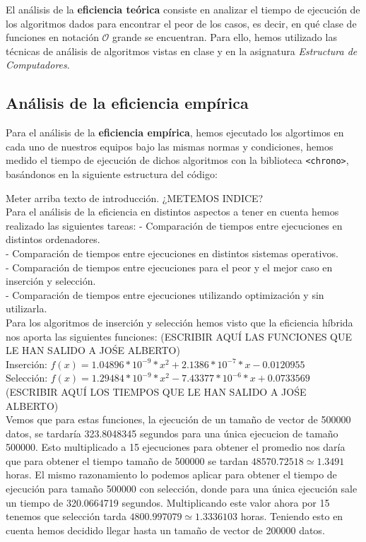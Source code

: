 \documentclass[10pt,a4paper]{article}
\begin{document}
El análisis de la \textbf{eficiencia teórica} consiste en analizar el tiempo de ejecución de los algoritmos dados para encontrar el peor de los casos, es decir, en qué clase de funciones en notación \(\mathcal{O}\) grande se encuentran. Para ello, hemos utilizado las técnicas de análisis de algoritmos vistas en clase y en la asignatura \textit{Estructura de Computadores}.

\subsection{Análisis de la eficiencia empírica}

Para el análisis de la \textbf{eficiencia empírica}, hemos ejecutado los algortimos en cada uno de nuestros equipos bajo las mismas normas y condiciones, hemos medido el tiempo de ejecución de dichos algoritmos con la biblioteca \texttt{<chrono>}, basándonos en la siguiente estructura del código:

\newpage

Meter arriba texto de introducción.
¿METEMOS INDICE?
\\
Para el análisis de la eficiencia en distintos aspectos a tener en cuenta hemos realizado las siguientes tareas:
	- Comparación de tiempos entre ejecuciones en distintos ordenadores. \\
	- Comparación de tiempos entre ejecuciones en distintos sistemas operativos. \\
	- Comparación de tiempos entre ejecuciones para el peor y el mejor caso en  inserción y selección. \\
	- Comparación de tiempos entre ejecuciones utilizando optimización y sin utilizarla. \\

Para los algoritmos de inserción y selección hemos visto que la eficiencia híbrida nos aporta las siguientes funciones:
(ESCRIBIR AQUÍ LAS FUNCIONES QUE LE HAN SALIDO A JOŚE ALBERTO)
\\
Inserción: $f(x) =  1.04896 * 10^{-9} * x^2 + 2.1386 * 10^{-7} * x - 0.0120955 $
\\
Selección: $f(x) =  1.29484 * 10^{-9} * x^2 - 7.43377 * 10^{-6} * x + 0.0733569 $
\\
(ESCRIBIR AQUÍ LOS TIEMPOS QUE LE HAN SALIDO A JOŚE ALBERTO)
\\
Vemos que para estas funciones, la ejecución de un tamaño de vector de 500000 datos, se tardaría  323.8048345 segundos para una única ejecucion de tamaño 500000. Esto multiplicado a 15 ejecuciones para obtener el promedio nos daría que para obtener el tiempo tamaño de 500000 se tardan $48570.72518 \simeq 1.3491$ horas. El mismo razonamiento lo podemos aplicar para obtener el tiempo de ejecución para tamaño 500000 con selección, donde para una única ejecución sale un tiempo de 320.0664719 segundos. Multiplicando este valor ahora por 15 tenemos que selección tarda $4800.997079 \simeq 1.3336103$ horas. Teniendo esto en cuenta hemos decidido llegar hasta un tamaño de vector de 200000 datos.
\end{document}
